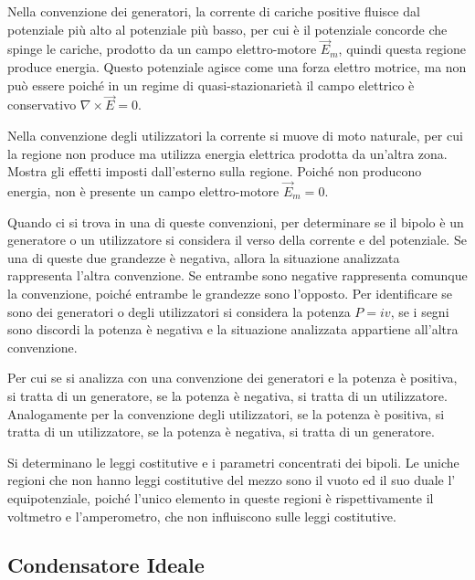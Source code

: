 \documentclass{article}
\numberwithin{equation}{subsection}
\begin{document}
Nella convenzione dei generatori, la corrente di cariche positive fluisce dal potenziale più alto al potenziale più basso, per cui è il potenziale concorde che spinge le 
cariche, prodotto da un campo elettro-motore $\vec{E}_m$, quindi questa regione produce energia. Questo potenziale agisce come una forza elettro motrice, ma non può essere 
poiché in un regime di quasi-stazionarietà il campo elettrico è conservativo $\nabla\times\vec{E}=0$. 


Nella convenzione degli utilizzatori la corrente si muove di moto naturale, per cui la regione non produce ma utilizza energia elettrica prodotta da un'altra zona. Mostra 
gli effetti imposti dall'esterno sulla regione. Poiché non producono energia, non è presente un campo elettro-motore $\vec{E}_m=0$. 


Quando ci si trova in una di queste convenzioni, per determinare se il bipolo è un generatore o un utilizzatore si considera il verso della corrente e del potenziale. Se una 
di queste due grandezze è negativa, allora la situazione analizzata rappresenta l'altra convenzione. Se entrambe sono negative rappresenta comunque la convenzione, poiché 
entrambe le grandezze sono l'opposto. Per identificare se sono dei generatori o degli utilizzatori si considera la potenza $P=iv$, se i segni sono discordi la potenza è negativa 
e la situazione analizzata appartiene all'altra convenzione. 

Per cui se si analizza con una convenzione dei generatori e la potenza è positiva, si tratta di un generatore, se la potenza è negativa, si tratta di un utilizzatore. 
Analogamente per la convenzione degli utilizzatori, se la potenza è positiva, si tratta di un utilizzatore, se la potenza è negativa, si tratta di un generatore. 



Si determinano le leggi costitutive e i parametri concentrati dei bipoli. Le uniche regioni che non hanno leggi costitutive del mezzo sono il vuoto ed il suo duale l'
equipotenziale, poiché l'unico elemento in queste regioni è rispettivamente il voltmetro e l'amperometro, che non influiscono sulle leggi costitutive. 

\subsection{Condensatore Ideale}
\end{document}
